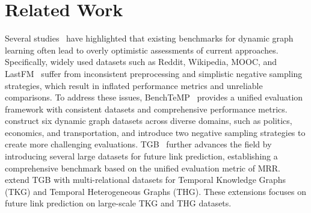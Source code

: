 \section{Related Work}
Several studies~\citep{edgebank,TGB} have highlighted that existing benchmarks for dynamic graph learning often lead to overly optimistic assessments of current approaches. Specifically, widely used datasets such as Reddit, Wikipedia, MOOC, and LastFM~\citep{Jodie} suffer from inconsistent preprocessing and simplistic negative sampling strategies, which result in inflated performance metrics and unreliable comparisons. To address these issues, BenchTeMP~\citep{Benchtemp} provides a unified evaluation framework with consistent datasets and comprehensive performance metrics. \citet{edgebank} construct six dynamic graph datasets across diverse domains, such as politics, economics, and transportation, and introduce two negative sampling strategies to create more challenging evaluations. 
TGB~\citep{TGB} further advances the field by introducing several large datasets for future link prediction, establishing a comprehensive benchmark based on the unified evaluation metric of MRR.
~\citet{gastinger2024tgb2} extend TGB with multi-relational datasets for Temporal Knowledge Graphs (TKG) and Temporal Heterogeneous Graphs (THG). These extensions focuses on future link prediction on large-scale TKG and THG datasets.

